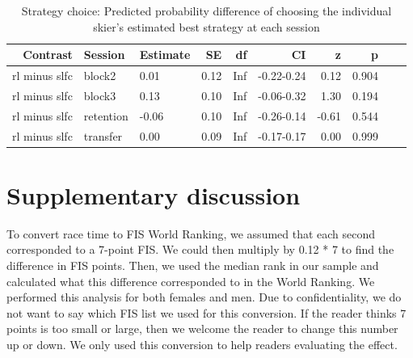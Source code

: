 \documentclass[pdflatex,sn-mathphys-num]{sn-jnl}%
\theoremstyle{thmstyleone}%
\theoremstyle{thmstyletwo}%
\theoremstyle{thmstylethree}%
\begin{document}
\begin{appendices}
\begin{table}[h!]
\caption{Strategy choice: Predicted probability difference of choosing the individual skier's estimated best strategy at each session}\label{table_strategychoice_estimatedbest_groupdiff}
\centering
\begin{tabular}{rllrrrrrrl}
  \hline
 Contrast & Session & Estimate & SE & df & CI & z & p \\ 
  \hline
 rl minus slfc & block2 & 0.01 & 0.12 & Inf & -0.22-0.24 & 0.12 &    0.904 \\ 
   rl minus slfc & block3 & 0.13 & 0.10 & Inf & -0.06-0.32 & 1.30 &    0.194 \\ 
   rl minus slfc & retention & -0.06 & 0.10 & Inf & -0.26-0.14 & -0.61 &    0.544 \\ 
  rl minus slfc & transfer & 0.00 & 0.09 & Inf & -0.17-0.17 & 0.00 &    0.999 \\ 
   \hline
\end{tabular}
\end{table}






\section{Supplementary discussion}\label{supdiscussion}
To convert race time to FIS World Ranking, we assumed that each second corresponded to a 7-point FIS. We could then multiply by 0.12 * 7 to find the difference in FIS points. Then, we used the median rank in our sample and calculated what this difference corresponded to in the World Ranking. We performed this analysis for both females and men. Due to confidentiality, we do not want to say which FIS list we used for this conversion. If the reader thinks 7 points is too small or large, then we welcome the reader to change this number up or down. We only used this conversion to help readers evaluating the effect. 











\end{appendices}
\end{document}
